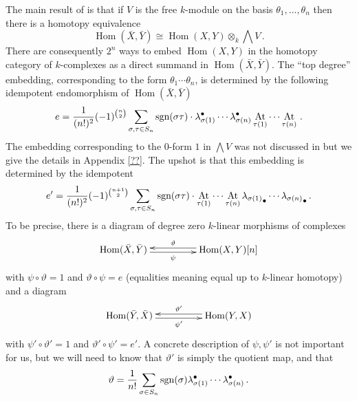 \documentclass{compositio}
\theoremstyle{definition}
\numberwithin{equation}{section}
\def\Hom{\operatorname{Hom}}
\DeclareMathOperator{\At}{At}
\begin{document}
The main result of \cite{??} is that if $V$ is the free $k$-module on the basis $\theta_1,\ldots,\theta_n$ then there is a homotopy equivalence
\[
\Hom(\bar{X}, \bar{Y}) \cong \Hom(X,Y) \otimes_k \bigwedge V\,.
\]
There are consequently $2^n$ ways to embed $\Hom(X,Y)$ in the homotopy category of $k$-complexes as a direct summand in $\Hom(\bar{X}, \bar{Y})$. The ``top degree'' embedding, corresponding to the form $\theta_1 \cdots \theta_n$, is determined by the following idempotent endomorphism of $\Hom(\bar{X}, \bar{Y})$
\[
e = \frac{1}{(n!)^2} (-1)^{\binom{n}{2}}\sum_{\sigma,\tau \in S_n} \textup{sgn}(\sigma\tau) \cdot \lambda_{\sigma(1)}^\bullet \cdots \lambda_{\sigma(n)}^\bullet \At_{\tau(1)} \cdots \At_{\tau(n)}\,.
\]
The embedding corresponding to the $0$-form $1$ in $\bigwedge V$ was not discussed in \cite{??} but we give the details in Appendix \ref{??}. The upshot is that this embedding is determined by the idempotent
\[
e' = \frac{1}{(n!)^2} (-1)^{\binom{n+1}{2}}\sum_{\sigma, \tau \in S_n} \textup{sgn}(\sigma\tau) \cdot \At_{\tau(1)} \cdots \At_{\tau(n)} {\lambda_{\sigma(1)}}_\bullet \cdots {\lambda_{\sigma(n)}}_\bullet\,.
\]
To be precise, there is a diagram of degree zero $k$-linear morphisms of complexes
\[
\xymatrix@C+2pc{
\Hom(\bar{X}, \bar{Y}) \ar@<-0.5ex>[r]_-{\psi} & \Hom(X,Y)[n] \ar@<-0.5ex>[l]_-{\vartheta}
}
\]
with $\psi \circ \vartheta = 1$ and $\vartheta \circ \psi = e$ (equalities meaning equal up to $k$-linear homotopy) and a diagram
\[
\xymatrix@C+2pc{
\Hom(\bar{Y}, \bar{X}) \ar@<-0.5ex>[r]_-{\psi'} & \Hom(Y,X) \ar@<-0.5ex>[l]_-{\vartheta'}
}
\]
with $\psi' \circ \vartheta' = 1$ and $\vartheta' \circ \psi' = e'$. A concrete description of $\psi, \psi'$ is not important for us, but we will need to know that $\vartheta'$ is simply the quotient map, and that
\[
\vartheta = \frac{1}{n!} \sum_{\sigma \in S_n} \textup{sgn}(\sigma) \lambda_{\sigma(1)}^\bullet \cdots \lambda_{\sigma(n)}^{\bullet}\,.
\]
\end{document}
